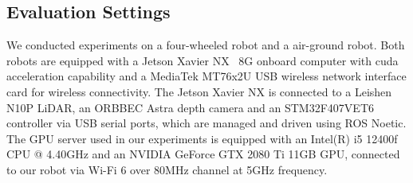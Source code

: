 \subsection{Evaluation Settings}


We conducted experiments on a four-wheeled robot and a air-ground robot.
Both robots are equipped with a Jetson Xavier NX~\cite{jetsonnx} 8G onboard computer with cuda acceleration capability and a MediaTek MT76x2U USB wireless network interface card for wireless connectivity.
The Jetson Xavier NX is connected to a Leishen N10P LiDAR, an ORBBEC Astra depth camera and an STM32F407VET6 controller via USB serial ports, which are managed and driven using ROS Noetic. 
The GPU server used in our experiments is equipped with an Intel(R) i5 12400f CPU @ 4.40GHz and an NVIDIA GeForce GTX 2080 Ti 11GB GPU, connected to our robot via Wi-Fi 6 over 80MHz channel at 5GHz frequency.



